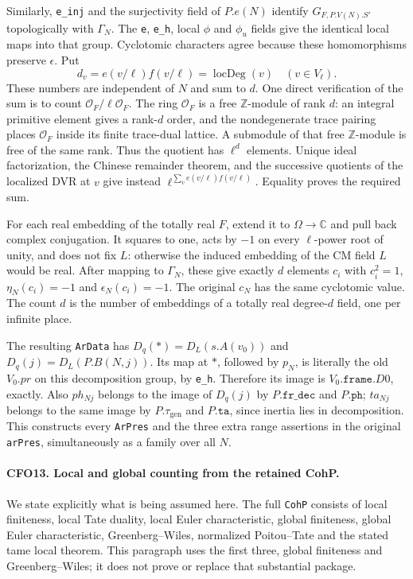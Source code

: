 Similarly, \texttt{e\_inj} and the surjectivity field of
$P.e(N)$ identify
$G_{F,P.V(N).S'}$ topologically with $\Gamma_N$.
The \texttt{e}, \texttt{e\_h}, local $\phi$ and $\phi_u$
fields give the identical local maps into that group.
Cyclotomic characters agree because these homomorphisms
preserve $\epsilon$.  Put
\[
 d_v=e(v/\ell)f(v/\ell)=\operatorname{locDeg}(v)
 \quad(v\in V_\ell).
 \]
These numbers are independent of $N$ and sum to $d$.
One direct verification of the sum is to count
$\mathcal O_F/\ell\mathcal O_F$.  The ring $\mathcal O_F$
is a free $\mathbb Z$-module of rank $d$: an integral
primitive element gives a rank-$d$ order, and the
nondegenerate trace pairing places $\mathcal O_F$ inside
its finite trace-dual lattice.  A submodule of that
free $\mathbb Z$-module is free of the same rank.
Thus the quotient has $\ell^d$ elements.
Unique ideal factorization, the Chinese remainder theorem,
and the successive quotients of the localized DVR at $v$
give instead $\ell^{\sum_v e(v/\ell)f(v/\ell)}$.
Equality proves the required sum.

For each real embedding of the totally real $F$, extend it
to $\Omega\to\mathbb C$ and pull back complex conjugation.
It squares to one, acts by $-1$ on every $\ell$-power root
of unity, and does not fix $L$: otherwise the induced
embedding of the CM field $L$ would be real.
After mapping to $\Gamma_N$, these give exactly $d$
elements $c_i$ with $c_i^2=1$, $\eta_N(c_i)=-1$ and
$\epsilon_N(c_i)=-1$.  The original $c_N$ has the same
cyclotomic value.  The count $d$ is the number of embeddings
of a totally real degree-$d$ field, one per infinite place.

The resulting \texttt{ArData} has
$D_q(\ast)=D_L(s.A(v_0))$ and
$D_q(j)=D_L(P.B(N,j))$.  Its map at $\ast$, followed by
$p_N$, is literally the old $V_0.pr$ on this decomposition
group, by \texttt{e\_h}.  Therefore its image is
$V_0.\texttt{frame}.D0$, exactly.  Also $ph_{Nj}$ belongs
to the image of $D_q(j)$ by $P.\texttt{fr\_dec}$ and
$P.\texttt{ph}$; $ta_{Nj}$ belongs to the same image by
$P.\tau_{\mathrm{gen}}$ and $P.\texttt{ta}$, since inertia
lies in decomposition.  This constructs every
\texttt{ArPres} and the three extra range assertions in
the original \texttt{arPres}, simultaneously as a family
over all $N$.

\paragraph{CFO13. Local and global counting from the retained CohP.}
\label{claim:CFO13}
We state explicitly what is being assumed here.  The full
\texttt{CohP} consists of local finiteness, local Tate
duality, local Euler characteristic, global finiteness,
global Euler characteristic, Greenberg--Wiles, normalized
Poitou--Tate and the stated tame local theorem.  This
paragraph uses the first three, global finiteness and
Greenberg--Wiles; it does not prove or replace that
substantial package.

